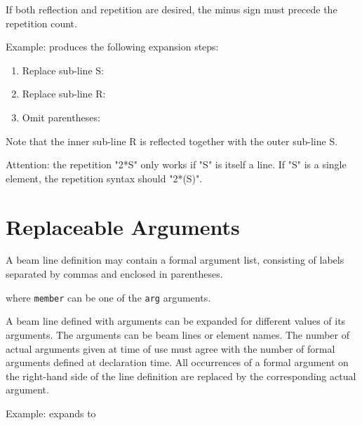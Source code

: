 If both reflection and repetition are desired, the minus sign must
precede the repetition count.  

Example: 
produces the following expansion steps:
\begin{enumerate}
  \item Replace sub-line S: 
  \item Replace sub-line R: 
  \item Omit parentheses: 
\end{enumerate}

Note that the inner sub-line R is reflected together with the outer
sub-line S.   

Attention: the repetition "2*S" only works if "S" is itself a
line. If "S" is a single element, the repetition syntax should  "2*(S)".
 


\section{Replaceable Arguments}
\label{sec:repl_args}

A beam line definition may contain a formal argument list, consisting of
labels separated by commas and enclosed in parentheses. 

where \texttt{member} can be one of the \texttt{arg} arguments.

A beam line defined with arguments can be expanded for different values
of its arguments.  
The arguments can be beam lines or element names. The number of actual
arguments given at time of use must agree with the number of formal
arguments defined at declaration time. All occurrences of a formal
argument on the right-hand side of the line definition are replaced by
the corresponding actual argument.  

Example:
expands to 

